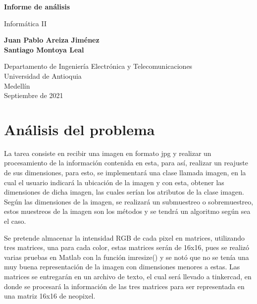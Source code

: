 \documentclass{article}
\begin{document}
\begin{titlepage}
    \begin{center}
        \vspace*{1cm}
            
        \Huge
        \textbf{Informe de análisis}
            
        \vspace{0.5cm}
        \LARGE
        Informática II
            
        \vspace{1.5cm}
            
        \textbf{Juan Pablo Areiza Jiménez\\Santiago Montoya Leal}
            
        \vfill
            
        \vspace{0.8cm}
            
        \Large
        Departamento de Ingeniería Electrónica y Telecomunicaciones\\
        Universidad de Antioquia\\
        Medellín\\
        Septiembre de 2021
            
    \end{center}
\end{titlepage}

\tableofcontents
\newpage
\section{Análisis del problema}\label{ap}
La tarea consiste en recibir una imagen en formato jpg y realizar un procesamiento de la información contenida en esta, para así, realizar un reajuste de sus dimensiones, para esto, se implementará una clase llamada imagen, en la cual el usuario indicará la ubicación de la imagen y con esta, obtener las dimensiones de dicha imagen, las cuales serían los atributos de la clase imagen. Según las dimensiones de la imagen, se realizará un submuestreo o sobremuestreo, estos muestreos de la imagen son los métodos y se tendrá un algoritmo según sea el caso.

Se pretende almacenar la intensidad RGB de cada pixel en matrices, utilizando tres matrices, una para cada color, estas matrices serán de 16x16, pues se realizó varias pruebas en Matlab con la función imresize() y se notó que no se tenía una muy buena representación de la imagen con dimensiones menores a estas. Las matrices se entregarán en un archivo de texto, el cual será llevado a tinkercad, en donde se procesará la información de las tres matrices para ser representada en una matriz 16x16 de neopixel.
\end{document}
